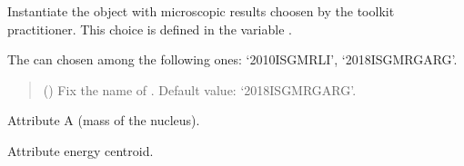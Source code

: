 \documentclass[letterpaper,10pt,english]{sphinxmanual}
\begin{document}
\begin{fulllineitems}
\label{\detokenize{source/api/setup_ISGMR:nucleardatapy.setup_ISGMR.SetupISGMR}}
\pysigstartsignatures
{}
\pysigstopsignatures
\sphinxAtStartPar
Instantiate the object with microscopic results choosen    by the toolkit practitioner.
This choice is defined in the variable .

\sphinxAtStartPar
The  can chosen among the following ones:    ‘2010\sphinxhyphen{}ISGMR\sphinxhyphen{}LI’, ‘2018\sphinxhyphen{}ISGMR\sphinxhyphen{}GARG’.
\begin{quote}\begin{description}
\sphinxAtStartPar
{} (\sphinxstyleliteralemphasis{\sphinxupquote{, }}) \textendash{} Fix the name of . Default value: ‘2018\sphinxhyphen{}ISGMR\sphinxhyphen{}GARG’.

\end{description}\end{quote}

\sphinxAtStartPar
{}

\begin{fulllineitems}
\label{\detokenize{source/api/setup_ISGMR:nucleardatapy.setup_ISGMR.SetupISGMR.A}}
\pysigstartsignatures
{}
\pysigstopsignatures
\sphinxAtStartPar
Attribute A (mass of the nucleus).

\end{fulllineitems}


\begin{fulllineitems}
\label{\detokenize{source/api/setup_ISGMR:nucleardatapy.setup_ISGMR.SetupISGMR.E_cen}}
\pysigstartsignatures
{}
\pysigstopsignatures
\sphinxAtStartPar
Attribute energy centroid.


\end{fulllineitems}
\end{fulllineitems}
\end{document}
